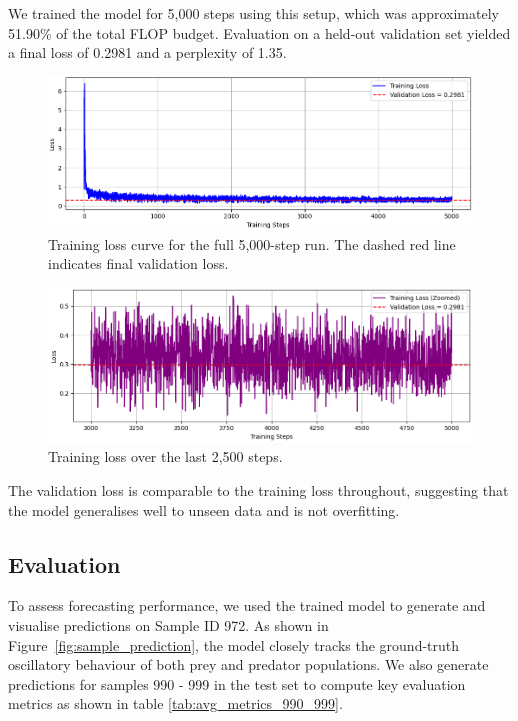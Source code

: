 \documentclass[a4paper,12pt]{article}
\begin{document}
We trained the model for 5,000 steps using this setup, which was approximately 51.90\% of the total FLOP budget. Evaluation on a held-out validation set yielded a final loss of 0.2981 and a perplexity of 1.35.

\begin{figure}[H]
    \centering
    \includegraphics[width=0.85\linewidth]{training_loss.png}
    \caption{Training loss curve for the full 5,000-step run. The dashed red line indicates final validation loss.}
    \label{fig:training_loss}
\end{figure}

\begin{figure}[H]
    \centering
    \includegraphics[width=0.85\linewidth]{zoomed_training_loss.png}
    \caption{Training loss over the last 2,500 steps.}
    \label{fig:zoomed_training_loss}
\end{figure}

The validation loss is comparable to the training loss throughout, suggesting that the model generalises well to unseen data and is not overfitting.

\subsection*{Evaluation}

To assess forecasting performance, we used the trained model to generate and visualise predictions on Sample ID 972. As shown in Figure~\ref{fig:sample_prediction}, the model closely tracks the ground-truth oscillatory behaviour of both prey and predator populations.
We also generate predictions for samples 990 - 999 in the test set to compute key evaluation metrics as shown in table \ref{tab:avg_metrics_990_999}.
\end{document}

